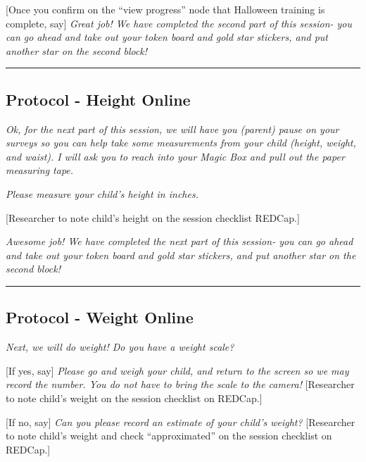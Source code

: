 \documentclass[]{book}
\begin{document}
{[}Once you confirm on the ``view progress'' node that Halloween training is complete, say{]} \emph{Great job! We have completed the second part of this session- you can go ahead and take out your token board and gold star stickers, and put another star on the second block!}

\begin{center}\rule{0.5\linewidth}{0.5pt}\end{center}

\hypertarget{protocol---height-online-1}{%
\subsection{Protocol - Height Online}\label{protocol---height-online-1}}

\emph{Ok, for the next part of this session, we will have you (parent) pause on your surveys so you can help take some measurements from your child (height, weight, and waist). I will ask you to reach into your Magic Box and pull out the paper measuring tape.}

\emph{Please measure your child's height in inches.}

{[}Researcher to note child's height on the session checklist REDCap.{]}

\emph{Awesome job! We have completed the next part of this session- you can go ahead and take out your token board and gold star stickers, and put another star on the second block!}

\begin{center}\rule{0.5\linewidth}{0.5pt}\end{center}

\hypertarget{protocol---weight-online-1}{%
\subsection{Protocol - Weight Online}\label{protocol---weight-online-1}}

\emph{Next, we will do weight! Do you have a weight scale?}

{[}If yes, say{]} \emph{Please go and weigh your child, and return to the screen so we may record the number. You do not have to bring the scale to the camera!} {[}Researcher to note child's weight on the session checklist on REDCap.{]}

{[}If no, say{]} \emph{Can you please record an estimate of your child's weight?} {[}Researcher to note child's weight and check ``approximated'' on the session checklist on REDCap.{]}
\end{document}
